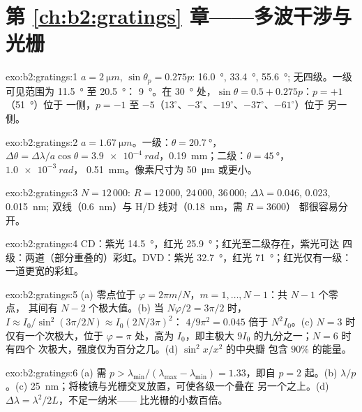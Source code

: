 \section*{第 \ref{ch:b2:gratings} 章——多波干涉与光栅}

\begin{solution}{exo:b2:gratings:1}
$a = \qty{2}{\micro m}$, $\sin\theta_p = 0.275p$: \qty{16.0}{\degree}, \qty{33.4}{\degree}, \qty{55.6}{\degree};
无四级。一级可见范围为 \qty{11.5}{\degree} 至 \qty{20.5}{\degree}：
\qty{9}{\degree}。在 \qty{30}{\degree} 处，$\sin\theta = 0.5 + 0.275p$：$p = +1$（\qty{51}{\degree}）位于
一侧，$p = -1$ 至 $-5$（$13^\circ$、$-3^\circ$、$-19^\circ$、$-37^\circ$、$-61^\circ$）位于
另一侧。
\end{solution}

\begin{solution}{exo:b2:gratings:2}
$a = \qty{1.67}{\micro m}$。一级：$\theta = \qty{20.7}{\degree}$，$\Delta\theta = \Delta\lambda/a\cos\theta =
\qty{3.9e-4}{rad}$，\qty{0.19}{mm}；二级：$\theta = \qty{45}{\degree}$，$\qty{1.0e-3}{rad}$，
\qty{0.51}{mm}。像素尺寸为 \qty{50}{\micro m} 或更小。
\end{solution}

\begin{solution}{exo:b2:gratings:3}
$N = 12\,000$: $R = 12\,000$, $24\,000$, $36\,000$; $\Delta\lambda = 0.046$, $0.023$, \qty{0.015}{nm};
双线（\qty{0.6}{nm}）与 H/D 线对（\qty{0.18}{nm}，需 $R = 3600$）
都很容易分开。
\end{solution}

\begin{solution}{exo:b2:gratings:4}
CD：紫光 \qty{14.5}{\degree}，红光 \qty{25.9}{\degree}；红光至二级存在，紫光可达
四级：两道（部分重叠的）彩虹。DVD：紫光 \qty{32.7}{\degree}，红光
\qty{71}{\degree}；红光仅有一级：一道更宽的彩虹。
\end{solution}

\begin{solution}{exo:b2:gratings:5}
(a) 零点位于 $\varphi = 2\pi m/N$，$m = 1, \dots, N - 1$：共 $N - 1$ 个零点，
其间有 $N - 2$ 个极大值。(b) 当 $N\varphi/2 = 3\pi/2$ 时，$I \approx I_0/\sin^2(3\pi/2N) \approx I_0(2N/3\pi)^2$：
$4/9\pi^2 = 0.045$ 倍于 $N^2I_0$。(c) $N = 3$ 时仅有一个次极大，位于
$\varphi = \pi$ 处，高为 $I_0$，即主极大 $9I_0$ 的九分之一；$N = 6$ 时有四个
次极大，强度仅为百分之几。(d) $\sin^2x/x^2$ 的中央瓣
包含 $90\%$ 的能量。
\end{solution}

\begin{solution}{exo:b2:gratings:6}
(a) 需 $p > \lambda_{\min}/(\lambda_{\max} - \lambda_{\min}) = 1.33$，即自 $p = 2$ 起。(b) $\lambda/p$。(c)
\qty{25}{nm}；将棱镜与光栅交叉放置，可使各级一个叠在
另一个之上。(d) $\Delta\lambda = \lambda^2/2L$，不足一纳米——
比光栅的小数百倍。
\end{solution}

